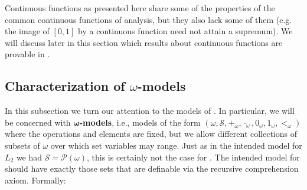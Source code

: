 \documentclass[../main.tex]{memoir}
\begin{document}
Continuous functions as presented here share some of the properties of the common continuous functions of analysis, but they also lack some of them (e.g. the image of $[0, 1]$ by a continuous function need not attain a supremum). We will discuss later in this section which results about continuous functions are provable in \rca.

\subsection{Characterization of $\omega$-models}

In this subsection we turn our attention to the models of \rca. In particular, we will be concerned with $\mathbf{\omega}$\textbf{-models}, i.e., models of the form $(\omega, \mathcal{S}, +_{\omega}, \cdot_{\omega}, 0_{\omega}, 1_{\omega}, <_{\omega})$ where the operations and elements are fixed, but we allow different collections of subsets of $\omega$ over which set variables may range. Just as in the intended model for $L_2$ we had $\mathcal{S} = \mathcal{P}(\omega)$, this is certainly not the case for \rca. The intended model for \rca should have exactly those sets that are definable via the recursive comprehension axiom. Formally:
\end{document}

